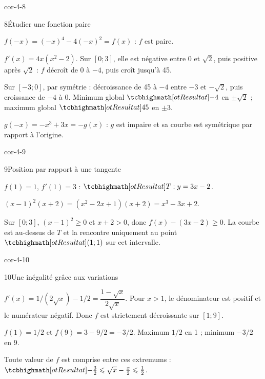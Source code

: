 \begin{blocLivre}{cor-4-8}
\begin{corrige}{8}{Étudier une fonction paire}
\begin{questions}
\item $f(-x)=(-x)^4-4(-x)^2=f(x)$ : $f$ est paire.
\item $f'(x)=4x(x^2-2)$. Sur $[0;3]$, elle est négative entre 0 et $\sqrt2$,
puis positive après $\sqrt2$ : $f$ décroît de 0 à $-4$, puis croît jusqu'à 45.
\item Sur $[-3;0]$, par symétrie : décroissance de 45 à $-4$ entre $-3$ et $-\sqrt2$,
puis croissance de $-4$ à 0. Minimum global $\res{-4}$ en $\pm\sqrt2$ ; maximum
global $\res{45}$ en $\pm3$.
\item $g(-x)=-x^3+3x=-g(x)$ : $g$ est impaire et sa courbe est symétrique par rapport à l'origine.
\end{questions}
\label{figlivre-r04-08-var-cor}

\end{corrige}
\end{blocLivre}
\begin{blocLivre}{cor-4-9}
\begin{corrige}{9}{Position par rapport à une tangente}
\begin{questions}
\item $f(1)=1$, $f'(1)=3$ : $\res{T:y=3x-2}$.
\item $(x-1)^2(x+2)=(x^2-2x+1)(x+2)=x^3-3x+2$.
\item Sur $[0;3]$, $(x-1)^2\geq0$ et $x+2>0$, donc
$f(x)-(3x-2)\geq0$. La courbe est au-dessus de $T$ et la rencontre uniquement
au point $\res{(1;1)}$ sur cet intervalle.
\end{questions}
\label{figlivre-r04-09-position-cor}

\end{corrige}
\end{blocLivre}
\begin{blocLivre}{cor-4-10}
\begin{corrige}{10}{Une inégalité grâce aux variations}
\begin{questions}
\item $f'(x)=1/(2\sqrt x)-1/2=\dfrac{1-\sqrt x}{2\sqrt x}$.
Pour $x>1$, le dénominateur est positif et le numérateur négatif.
Donc $f$ est strictement décroissante sur $[1;9]$.
\item $f(1)=1/2$ et $f(9)=3-9/2=-3/2$. Maximum $1/2$ en 1 ; minimum $-3/2$ en 9.
\item Toute valeur de $f$ est comprise entre ces extremums :
$\res{-\frac32\leq\sqrt x-\frac x2\leq\frac12}$.
\end{questions}
\label{figlivre-r04-10-var-cor}

\end{corrige}
\end{blocLivre}
